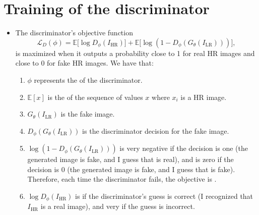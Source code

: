 \section*{Training of the discriminator}
\begin{itemize}
\item The discriminator’s objective function
\begin{equation}
  \mathcal{L}_D(\phi) = 
  \mathbb{E}\big[ \log D_\phi(I_{\text{HR}}) \big] 
  + \mathbb{E}\big[ \log (1 - D_\phi(G_\theta(I_{\text{LR}}))) \big],
\end{equation}
is maximized when it outputs a probability close to 1 for real HR
images and close to 0 for fake HR images. We have that:
\begin{enumerate}
\item $\phi$ represents the  of
  the discriminator.
\item $\mathbb{E}[x]$ is the
   of the sequence of values
  $x$ where $x_i$ is a HR image.
\item $G_\theta(I_{\text{LR}})$ is the fake image.
\item $ D_\phi(G_\theta(I_{\text{LR}}))$ is the discriminator decision for the fake image.
\item $\log(1 - D_\phi(G_\theta(I_{\text{LR}})))$ is very negative if
  the decision is one (the generated image is fake, and I guess that
  is real), and is zero if the decision is 0 (the generated image is
  fake, and I guess that is fake). Therefore, each time the
  discriminator fails, the objective is .
\item $\log D_\phi(I_{\text{HR}})$ is  if the
  discriminator's guess is correct (I recognized that $I_{\text{HR}}$
  is a real image), and very  if the guess is
  incorrect.
\end{enumerate}
\end{itemize}

